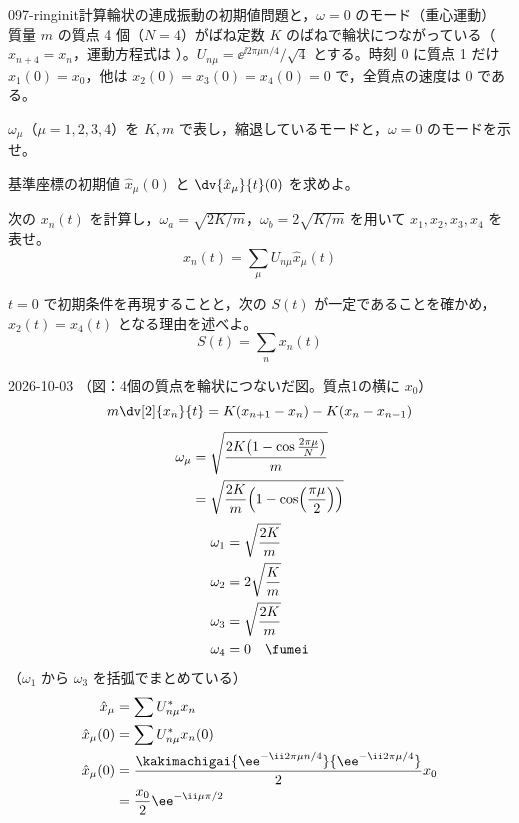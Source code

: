 \documentclass[uplatex,dvipdfmx,a4paper,11pt]{jsarticle}
\begin{document}
\begin{mondai}{097-ringinit}{計算}{輪状の連成振動の初期値問題と，$\omega=0$ のモード（重心運動）}
質量 $m$ の質点 4 個（$N=4$）がばね定数 $K$ のばねで輪状につながっている（$x_{n+4}=x_n$，運動方程式は ）。$U_{n\mu}=\ee^{\ii2\pi\mu n/4}/\sqrt{4}$ とする。時刻 $0$ に質点 1 だけ $x_1(0)=x_0$，他は $x_2(0)=x_3(0)=x_4(0)=0$ で，全質点の速度は 0 である。
  \begin{shoumon}
    \item $\omega_\mu$（$\mu=1,2,3,4$）を $K,m$ で表し，縮退しているモードと，$\omega=0$ のモードを示せ。
    \item 基準座標の初期値 $\hat{x}_\mu(0)$ と $\dv{\hat{x}_\mu}{t}(0)$ を求めよ。
    \item 次の $x_n(t)$ を計算し，$\omega_a=\sqrt{2K/m}$，$\omega_b=2\sqrt{K/m}$ を用いて $x_1,x_2,x_3,x_4$ を表せ。
      \[ x_n(t)=\sum_\mu U_{n\mu}\hat{x}_\mu(t) \]
    \item $t=0$ で初期条件を再現することと，次の $S(t)$ が一定であることを確かめ，$x_2(t)=x_4(t)$ となる理由を述べよ。
      \[ S(t)=\sum_nx_n(t) \]
  \end{shoumon}
\begin{kotaeutsushi}{2026-10-03}
（図：4個の質点を輪状につないだ図。質点1の横に $x_0$）
\[ m\dv[2]{x_n}{t}=K(x_{n+1}-x_n)-K(x_n-x_{n-1}) \]
\begin{align*}
  \omega_\mu&=\sqrt{\frac{2K\bigl(1-\cos\frac{2\pi\mu}{N}\bigr)}{m}}\\
  &=\sqrt{\frac{2K}{m}\Bigl(1-\cos\Bigl(\frac{\pi\mu}{2}\Bigr)\Bigr)}
\end{align*}
\begin{align*}
  \omega_1&=\sqrt{\frac{2K}{m}}\\
  \omega_2&=2\sqrt{\frac{K}{m}}\\
  \omega_3&=\sqrt{\frac{2K}{m}}\\
  \omega_4&=0\quad\fumei
\end{align*}
（$\omega_1$ から $\omega_3$ を括弧でまとめている）
\begin{align*}
  \hat{x}_\mu&=\sum U^{*}_{n\mu}x_n\\
  \hat{x}_\mu(0)&=\sum U^{*}_{n\mu}x_n(0)\\
  \hat{x}_\mu(0)&=\frac{\kakimachigai{\ee^{-\ii2\pi\mu n/4}}{\ee^{-\ii2\pi\mu/4}}}{2}x_0\\
  &=\frac{x_0}{2}\ee^{-\ii\mu\pi/2}
\end{align*}

\end{kotaeutsushi}
\end{mondai}
\end{document}

